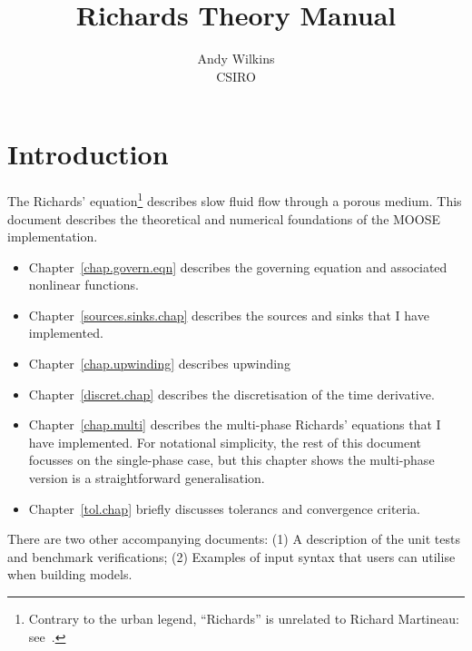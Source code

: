 \documentclass[]{scrreprt}
\begin{document}
\title{Richards Theory Manual}
\author{Andy Wilkins \\
CSIRO}
\maketitle

\tableofcontents

\chapter{Introduction}

The Richards' equation\footnote{Contrary to the urban legend,
  ``Richards'' is unrelated to Richard Martineau:
  see~\cite{richards1931}.} describes slow fluid flow through a porous
medium.  This document describes the theoretical and numerical
foundations of the MOOSE implementation.
\begin{itemize}
\item Chapter~\ref{chap.govern.eqn} describes the governing equation
  and associated nonlinear functions.
\item Chapter~\ref{sources.sinks.chap} describes the sources and sinks
  that I have implemented.
\item Chapter~\ref{chap.upwinding} describes upwinding
\item Chapter~\ref{discret.chap} describes the discretisation of the time derivative.
\item Chapter~\ref{chap.multi} describes the multi-phase Richards'
  equations that I have implemented.  For notational simplicity, the
  rest of this document focusses on the single-phase case, but this
  chapter shows the multi-phase version is a straightforward
  generalisation.
\item Chapter~\ref{tol.chap} briefly discusses tolerancs and
  convergence criteria.
\end{itemize}
There are two other accompanying documents: (1) A description of the
unit tests and benchmark verifications; (2) Examples of input syntax
that users can utilise when building models.

\end{document}
